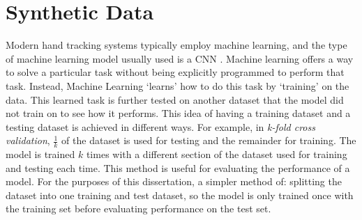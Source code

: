 \chapter{Synthetic Data}
\label{chap:sd}

Modern hand tracking systems typically employ machine learning, and the type of machine learning model usually used is a CNN \cite{mueller2017real, malik2018deephps, wang2018mask, wan2019dual, moon2018v2v}. Machine learning offers a way to solve a particular task without being explicitly programmed to perform that task. Instead, Machine Learning `learns' how to do this task by `training' on the data. This learned task is further tested on another dataset that the model did not train on to see how it performs. This idea of having a training dataset and a testing dataset is achieved in different ways. For example, in {\slshape k-fold cross validation}, $\frac{1}{k}$ of the dataset is used for testing and the remainder for training. The model is trained $k$ times with a different section of the dataset used for training and testing each time. This method is useful for evaluating the performance of a model. For the purposes of this dissertation, a simpler method of: splitting the dataset into one training and test dataset, so the model is only trained once with the training set before evaluating performance on the test set.

